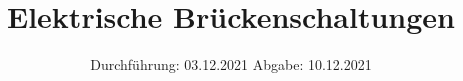 

\subject{VERSUCH 302}
\title{Elektrische Brückenschaltungen}
\date{%
  Durchführung: 03.12.2021
  \hspace{3em}
  Abgabe: 10.12.2021
}



\maketitle
\thispagestyle{empty}
\tableofcontents
\newpage







\printbibliography{}


